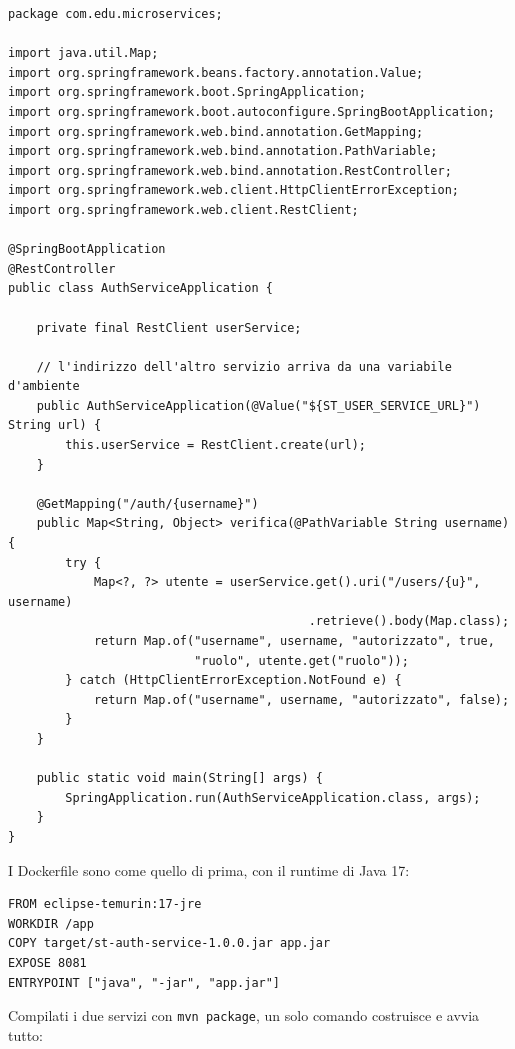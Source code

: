 \begin{lstlisting}[style=java, name=AuthServiceApplication.java]
package com.edu.microservices;

import java.util.Map;
import org.springframework.beans.factory.annotation.Value;
import org.springframework.boot.SpringApplication;
import org.springframework.boot.autoconfigure.SpringBootApplication;
import org.springframework.web.bind.annotation.GetMapping;
import org.springframework.web.bind.annotation.PathVariable;
import org.springframework.web.bind.annotation.RestController;
import org.springframework.web.client.HttpClientErrorException;
import org.springframework.web.client.RestClient;

@SpringBootApplication
@RestController
public class AuthServiceApplication {

    private final RestClient userService;

    // l'indirizzo dell'altro servizio arriva da una variabile d'ambiente
    public AuthServiceApplication(@Value("${ST_USER_SERVICE_URL}") String url) {
        this.userService = RestClient.create(url);
    }

    @GetMapping("/auth/{username}")
    public Map<String, Object> verifica(@PathVariable String username) {
        try {
            Map<?, ?> utente = userService.get().uri("/users/{u}", username)
                                          .retrieve().body(Map.class);
            return Map.of("username", username, "autorizzato", true,
                          "ruolo", utente.get("ruolo"));
        } catch (HttpClientErrorException.NotFound e) {
            return Map.of("username", username, "autorizzato", false);
        }
    }

    public static void main(String[] args) {
        SpringApplication.run(AuthServiceApplication.class, args);
    }
}
\end{lstlisting}

I Dockerfile sono come quello di prima, con il runtime di Java 17:

\begin{lstlisting}[style=docker, name=st-auth-service/Dockerfile]
FROM eclipse-temurin:17-jre
WORKDIR /app
COPY target/st-auth-service-1.0.0.jar app.jar
EXPOSE 8081
ENTRYPOINT ["java", "-jar", "app.jar"]
\end{lstlisting}

Compilati i due servizi con \texttt{mvn package}, un solo comando costruisce e avvia tutto:

